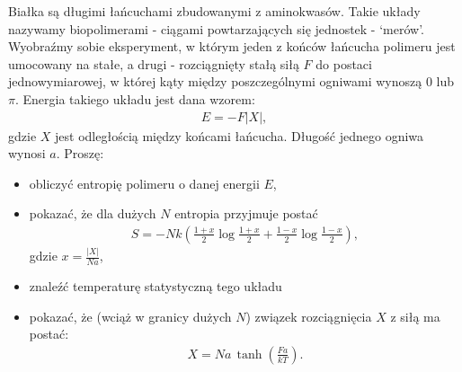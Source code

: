 \documentclass[11pt,a4paper]{article}
\begin{document}
Białka są długimi łańcuchami zbudowanymi z aminokwasów. Takie układy nazywamy biopolimerami - 
ciągami powtarzających się jednostek - `merów'. 
Wyobraźmy sobie eksperyment, w którym jeden z końców łańcucha polimeru jest umocowany na stałe, 
a drugi - rozciągnięty stałą siłą $F$ do postaci jednowymiarowej, w której 
kąty między poszczególnymi ogniwami wynoszą $0$ lub $\pi$. Energia takiego układu jest dana wzorem:
\begin{align*}
  E = -F|X|,
\end{align*}
gdzie $X$ jest odległością między końcami łańcucha. Długość jednego ogniwa wynosi $a$.
Proszę:
\begin{itemize}
  \item obliczyć entropię polimeru o danej energii $E$,
  \item pokazać, że dla dużych $N$ entropia przyjmuje postać
        \begin{align*}
        S = -Nk\left( \frac{1+x}{2}\log\frac{1+x}{2} + \frac{1-x}{2}\log\frac{1-x}{2} \right),
        \end{align*}
        gdzie $x = \frac{|X|}{Na}$,
  \item znaleźć temperaturę statystyczną tego układu
  \item pokazać, że (wciąż w granicy dużych $N$) związek rozciągnięcia $X$ z siłą ma postać:
        \begin{align*}
        X = Na\,\tanh\left(\frac{Fa}{kT}\right).
        \end{align*}
\end{itemize}
\end{document}

